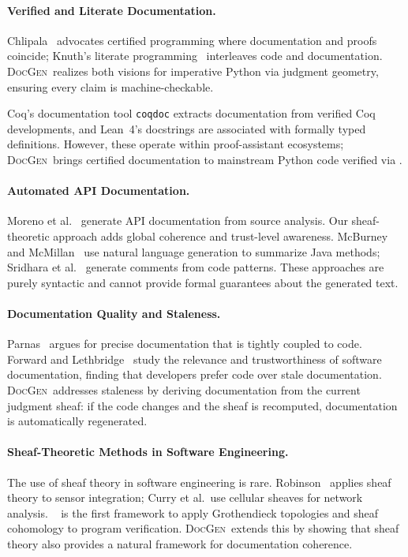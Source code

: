 \documentclass[11pt]{article}
\newcommand{\DocGen}{\textsc{DocGen}}
\begin{document}
\paragraph{Verified and Literate Documentation.}
Chlipala~\cite{Chlipala2013} advocates certified programming where
documentation and proofs coincide; Knuth's literate
programming~\cite{Knuth1984} interleaves code and documentation.
\DocGen\ realizes both visions for imperative Python via judgment
geometry, ensuring every claim is machine-checkable.

Coq's documentation tool \texttt{coqdoc} extracts documentation from
verified Coq developments, and Lean~4's docstrings are associated
with formally typed definitions.  However, these operate within
proof-assistant ecosystems; \DocGen\ brings certified documentation
to mainstream Python code verified via \JuGeo.

\paragraph{Automated API Documentation.}
Moreno et al.~\cite{Moreno2013} generate API documentation from source
analysis.  Our sheaf-theoretic approach adds global coherence and
trust-level awareness.  McBurney and McMillan~\cite{McBurney2014}
use natural language generation to summarize Java methods; Sridhara
et al.~\cite{Sridhara2010} generate comments from code patterns.
These approaches are purely syntactic and cannot provide formal
guarantees about the generated text.

\paragraph{Documentation Quality and Staleness.}
Parnas~\cite{Parnas2011} argues for precise documentation that is
tightly coupled to code.  Forward and Lethbridge~\cite{Forward2002}
study the relevance and trustworthiness of software documentation,
finding that developers prefer code over stale documentation.
\DocGen\ addresses staleness by deriving documentation from the
current judgment sheaf: if the code changes and the sheaf is
recomputed, documentation is automatically regenerated.

\paragraph{Sheaf-Theoretic Methods in Software Engineering.}
The use of sheaf theory in software engineering is rare.
Robinson~\cite{Robinson2014} applies sheaf theory to sensor
integration; Curry et al.\ use cellular sheaves for network
analysis.  \JuGeo~\cite{JuGeo2023} is the first framework to
apply Grothendieck topologies and sheaf cohomology to program
verification.  \DocGen\ extends this by showing that sheaf
theory also provides a natural framework for documentation
coherence.
\end{document}
